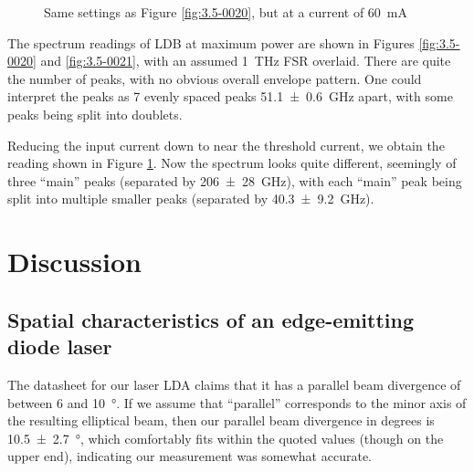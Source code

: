 \documentclass[a4paper]{scrartcl}
\begin{document}
\begin{figure}
    \centering
    \caption{Same settings as Figure \ref{fig:3.5-0020}, but at a current of \SI{60}{\milli\ampere}}
    \label{fig:3.5-0022}
\end{figure}

The spectrum readings of LDB at maximum power are shown in Figures \ref{fig:3.5-0020} and \ref{fig:3.5-0021}, with an assumed \SI{1}{\tera\hertz} FSR overlaid. There are quite the number of peaks, with no obvious overall envelope pattern. One could interpret the peaks as 7 evenly spaced peaks \SI{51.1 \pm 0.6}{\giga\hertz} apart, with some peaks being split into doublets.

Reducing the input current down to near the threshold current, we obtain the reading shown in Figure \ref{fig:3.5-0022}. Now the spectrum looks quite different, seemingly of three ``main'' peaks (separated by \SI{206 \pm 28}{\giga\hertz}), with each ``main'' peak being split into multiple smaller peaks (separated by \SI{40.3 \pm 9.2}{\giga\hertz}).

\section{Discussion}
\subsection{Spatial characteristics of an edge-emitting diode laser}
The datasheet for our laser LDA claims that it has a parallel beam divergence of between 6 and \SI{10}{\degree}. If we assume that ``parallel'' corresponds to the minor axis of the resulting elliptical beam, then our parallel beam divergence in degrees is \SI{10.5 \pm 2.7}{\degree}, which comfortably fits within the quoted values (though on the upper end), indicating our measurement was somewhat accurate.
\end{document}
